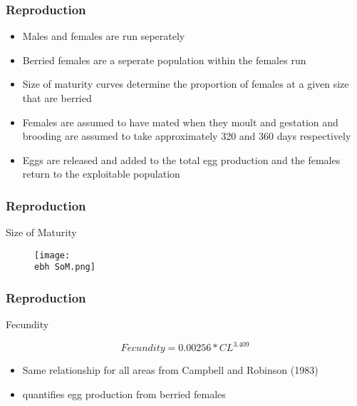 \documentclass{beamer}
\newcommand{\ebh}{\string~/bio.data/bio.lobster/figures/LFA2733Framework2018/} %
\begin{document}
\begin{frame}
\frametitle{Reproduction}
\begin{itemize}
\item Males and females are run seperately
\item Berried females are a seperate population within the females run
\item Size of maturity curves determine the proportion of females at a given size that are berried
\item Females are assumed to have mated when they moult and gestation and brooding are assumed to take approximately 320 and 360 days respectively
\item Eggs are released and added to the total egg production and the females return to the exploitable population
\end{itemize}
\end{frame}


\begin{frame}
\frametitle{Reproduction}
Size of Maturity
\begin{figure}
        \begin{center}
            \texttt{[image: \\ebh SoM.png]}
        \end{center}
    \end{figure}
\end{frame}


\begin{frame}
\frametitle{Reproduction}
Fecundity

\begin{equation*}
Fecundity = 0.00256 * CL^3.409
\end{equation*}

\begin{itemize}
\item Same relationship for all areas from Campbell and Robinson (1983)
\item quantifies egg production from berried females
\end{itemize}
\end{frame}
\end{document}
